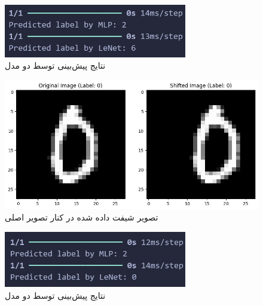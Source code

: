 \documentclass[a4paper]{article}
\begin{document}
\begin{itemize}
\begin{itemize}
\begin{figure}[!h]
\begin{center}
			\includegraphics[width= 8cm]{Pic9.png}
		\end{center}
		\caption{نتایج پیش‌بینی توسط دو مدل}
	\end{figure}
	\newpage
	\begin{figure}[!h]
		\begin{center}
			\includegraphics[width= 12cm]{Pic10.png}
		\end{center}
		\caption{تصویر شیفت داده شده در کنار تصویر اصلی}
	\end{figure}
	\begin{figure}[!h]
		\begin{center}
			\includegraphics[width= 8cm]{Pic11.png}
		\end{center}
		\caption{نتایج پیش‌بینی توسط دو مدل}
	\end{figure}
		

\end{itemize}
\end{itemize}
\end{document}
